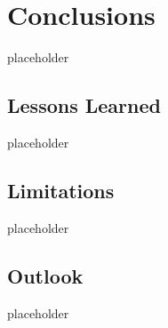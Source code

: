 \chapter{Conclusions}
\label{chap:conclusion}
placeholder

\section{Lessons Learned}
placeholder
\section{Limitations}
placeholder

\section{Outlook}
placeholder